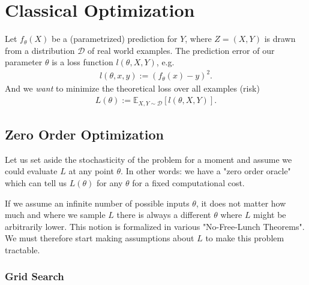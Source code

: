
\newcommand{\dist}{\mathcal{D}}
\newcommand{\E}{\mathbb{E}}
\newcommand{\identity}{\mathbb{I}}
\newcommand{\diag}{\text{diag}}
\newcommand{\rate}{\text{rate}}

\chapter{Classical Optimization}

Let \(f_\theta(X)\) be a (parametrized) prediction for \(Y\), where \(Z=(X,Y)\)
is drawn from a distribution \(\dist\) of real world examples. The prediction
error of our parameter \(\theta\) is a loss function \(l(\theta, X, Y)\), e.g. 
%
\begin{align*}
	l(\theta, x, y) := (f_\theta(x) - y)^2.
\end{align*}
%
And we \emph{want} to minimize the theoretical loss over all examples (risk)
%
\begin{align*}
	L(\theta) := \E_{X,Y\sim \dist} [l(\theta, X, Y)].
\end{align*}

\section{Zero Order Optimization}

Let us set aside the stochasticity of the problem for a moment and assume we
could evaluate \(L\) at any point \(\theta\). In other words: we have a "zero
order oracle" which can tell us \(L(\theta)\) for any \(\theta\) for a fixed
computational cost.

If we assume an infinite number of possible inputs \(\theta\), it does not matter
how much and where we sample \(L\) there is always a different \(\theta\) where
\(L\) might be arbitrarily lower. This notion is formalized in various "No-Free-Lunch
Theorems". We must therefore start making assumptions about \(L\) to make this
problem tractable.

\subsection{Grid Search}

